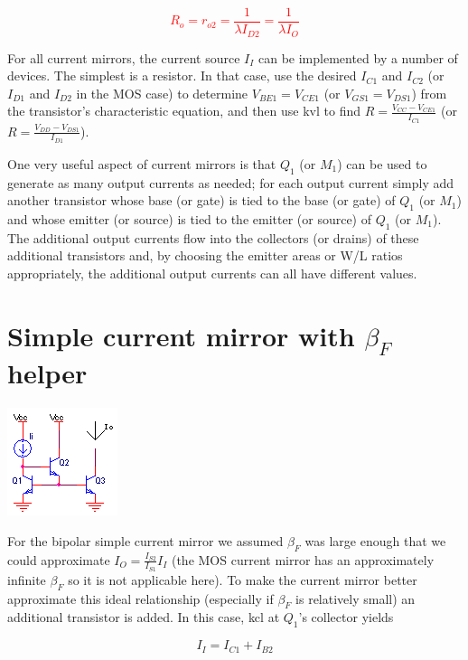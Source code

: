 \textcolor{red}{
\begin{equation}
R_{o} = r_{o2} = \frac{1}{\lambda I_{D2}} = \frac{1}{\lambda I_{O}}
\label{eq:MOSsimplecurrentmirror_Ro}
\end{equation}
}

For all current mirrors, the current source $I_{I}$ can be implemented by a number of devices.
The simplest is a resistor.
In that case, use the desired $I_{C1}$ and $I_{C2}$ (or $I_{D1}$ and $I_{D2}$ in the MOS case) to determine $V_{BE1} = V_{CE1}$ (or $V_{GS1} = V_{DS1}$) from the transistor's characteristic equation, and then use \ac{kvl} to find $R = \frac{V_{CC} - V_{CE1}}{I_{C1}}$ (or $R = \frac{V_{DD} - V_{DS1}}{I_{D1}}$).

One very useful aspect of current mirrors is that $Q_1$ (or $M_1$) can be used to generate as many output currents as needed;
for each output current simply add another transistor whose base (or gate) is tied to the base (or gate) of $Q_1$ (or $M_1$) and whose emitter (or source) is tied to the emitter (or source) of $Q_1$ (or $M_1$).
The additional output currents flow into the collectors (or drains) of these additional transistors and, by choosing the emitter areas or W/L ratios appropriately, the additional output currents can all have different values.

\section{Simple current mirror with $\beta_{F}$ helper}
\begin{center}
	\includegraphics{schematics/currentmirrorbetahelper.PNG}
\end{center}
For the bipolar simple current mirror we assumed $\beta_{F}$ was large enough that we could approximate $I_{O} = \frac{I_{S2}}{I_{S1}}I_{I}$ (the MOS current mirror has an approximately infinite $\beta_{F}$ so it is not applicable here).
To make the current mirror better approximate this ideal relationship (especially if $\beta_{F}$ is relatively small) an additional transistor is added. In this case, \ac{kcl} at $Q_1$'s collector yields

\begin{equation}
I_{I} = I_{C1} + I_{B2}
\label{eq:currentmirrorbetahelper_KCL}
\end{equation}

